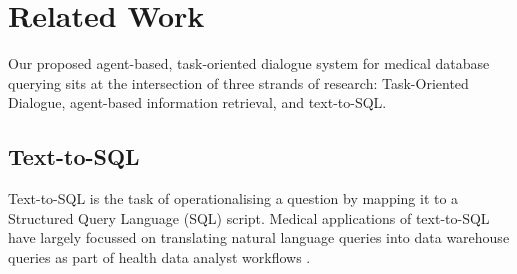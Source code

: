 \documentclass[11pt]{article}
\begin{document}




\section{Related Work}

Our proposed agent-based, task-oriented dialogue system for medical database querying sits at the intersection of three strands of research: Task-Oriented Dialogue, agent-based information retrieval, and text-to-SQL.

\subsection{Text-to-SQL}
Text-to-SQL is the task of operationalising a question by mapping it to a Structured Query Language (SQL) script. Medical applications of text-to-SQL have largely focussed on translating natural language queries into data warehouse queries as part of health data analyst workflows \citet{ziletti_retrieval_2024, ziletti_generating_2025}.
\end{document}
